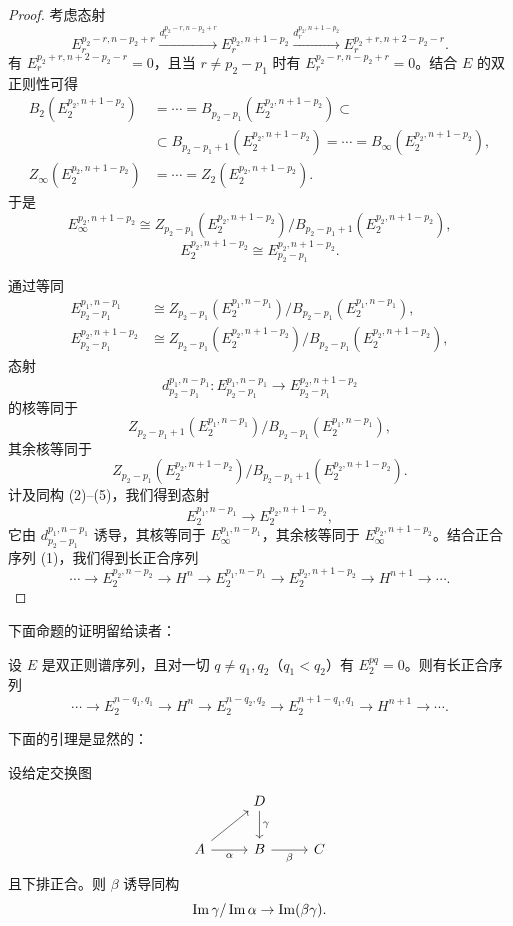\begin{proof}
考虑态射
\[
E_r^{p_2-r,n-p_2+r}\xrightarrow{d_r^{p_2-r,n-p_2+r}}E_r^{p_2,n+1-p_2}\xrightarrow{d_r^{p_2,n+1-p_2}}E_r^{p_2+r,n+2-p_2-r}.
\]
有 $E_r^{p_2+r,n+2-p_2-r}=0$，且当 $r\ne p_2-p_1$ 时有 $E_r^{p_2-r,n-p_2+r}=0$。结合 $E$ 的双正则性可得
\[
\begin{aligned}
B_2(E_2^{p_2,n+1-p_2})&=\cdots=B_{p_2-p_1}(E_2^{p_2,n+1-p_2})\subset\\
&\subset B_{p_2-p_1+1}(E_2^{p_2,n+1-p_2})=\cdots=B_\infty(E_2^{p_2,n+1-p_2}),\\
Z_\infty(E_2^{p_2,n+1-p_2})&=\cdots=Z_2(E_2^{p_2,n+1-p_2}).
\end{aligned}
\]
于是
\begin{equation*}\tag{4}
E_\infty^{p_2,n+1-p_2}\cong Z_{p_2-p_1}(E_2^{p_2,n+1-p_2})/B_{p_2-p_1+1}(E_2^{p_2,n+1-p_2}),
\end{equation*}
\begin{equation*}\tag{5}
E_2^{p_2,n+1-p_2}\cong E_{p_2-p_1}^{p_2,n+1-p_2}.
\end{equation*}

通过等同
\[
\begin{aligned}
E_{p_2-p_1}^{p_1,n-p_1}&\cong Z_{p_2-p_1}(E_2^{p_1,n-p_1})/B_{p_2-p_1}(E_2^{p_1,n-p_1}),\\
E_{p_2-p_1}^{p_2,n+1-p_2}&\cong Z_{p_2-p_1}(E_2^{p_2,n+1-p_2})/B_{p_2-p_1}(E_2^{p_2,n+1-p_2}),
\end{aligned}
\]
态射
\[
d_{p_2-p_1}^{p_1,n-p_1}\colon E_{p_2-p_1}^{p_1,n-p_1}\to E_{p_2-p_1}^{p_2,n+1-p_2}
\]
的核等同于
\[
Z_{p_2-p_1+1}(E_2^{p_1,n-p_1})/B_{p_2-p_1}(E_2^{p_1,n-p_1}),
\]
其余核等同于
\[
Z_{p_2-p_1}(E_2^{p_2,n+1-p_2})/B_{p_2-p_1+1}(E_2^{p_2,n+1-p_2}).
\]
计及同构 (2)–(5)，我们得到态射
\[
E_2^{p_1,n-p_1}\to E_2^{p_2,n+1-p_2},
\]
它由 $d_{p_2-p_1}^{p_1,n-p_1}$ 诱导，其核等同于 $E_\infty^{p_1,n-p_1}$，其余核等同于 $E_\infty^{p_2,n+1-p_2}$。结合正合序列 (1)，我们得到长正合序列
\[
\cdots\to E_2^{p_2,n-p_2}\to H^n\to E_2^{p_1,n-p_1}\to E_2^{p_2,n+1-p_2}\to H^{n+1}\to\cdots.
\]
\end{proof}

下面命题的证明留给读者：

\begin{proposition}\label{it:2.2.5}
设 $E$ 是双正则谱序列，且对一切 $q\ne q_1,q_2$（$q_1<q_2$）有 $E_2^{pq}=0$。则有长正合序列
\[
\cdots\to E_2^{n-q_1,q_1}\to H^n\to E_2^{n-q_2,q_2}\to E_2^{n+1-q_1,q_1}\to H^{n+1}\to\cdots.
\]
\end{proposition}

下面的引理是显然的：

\begin{lemma}\label{it:2.2.6}
设给定交换图
\[\begin{tikzcd}[column sep=2.6em,row sep=2.0em]
& D \arrow[d,"\gamma"] & \\
A \arrow[ur] \arrow[r,"\alpha"'] & B \arrow[r,"\beta"'] & C
\end{tikzcd}\]
且下排正合。则 $\beta$ 诱导同构
\[
\operatorname{Im}\gamma/\operatorname{Im}\alpha\to\operatorname{Im}(\beta\gamma).
\]
\end{lemma}

